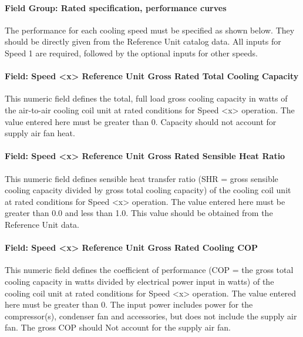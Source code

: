 \paragraph{Field Group: Rated specification, performance curves}\label{field-group-rated-specification-performance-curves}

The performance for each cooling speed must be specified as shown below. They should be directly given from the Reference Unit catalog data. All inputs for Speed 1 are required, followed by the optional inputs for other speeds.

\paragraph{Field: Speed \textless{}x\textgreater{} Reference Unit Gross Rated Total Cooling Capacity}\label{field-speed-x-reference-unit-gross-rated-total-cooling-capacity}

This numeric field defines the total, full load gross cooling capacity in watts of the air-to-air cooling coil unit at rated conditions for Speed \textless{}x\textgreater{} operation. The value entered here must be greater than 0. Capacity should not account for supply air fan heat.

\paragraph{Field: Speed \textless{}x\textgreater{} Reference Unit Gross Rated Sensible Heat Ratio}\label{field-speed-x-reference-unit-gross-rated-sensible-heat-ratio}

This numeric field defines sensible heat transfer ratio (SHR = gross sensible cooling capacity divided by gross total cooling capacity) of the cooling coil unit at rated conditions for Speed \textless{}x\textgreater{} operation. The value entered here must be greater than 0.0 and less than 1.0. This value should be obtained from the Reference Unit data.

\paragraph{Field: Speed \textless{}x\textgreater{} Reference Unit Gross Rated Cooling COP}\label{field-speed-x-reference-unit-gross-rated-cooling-cop}

This numeric field defines the coefficient of performance (COP = the gross total cooling capacity in watts divided by electrical power input in watts) of the cooling coil unit at rated conditions for Speed \textless{}x\textgreater{} operation. The value entered here must be greater than 0. The input power includes power for the compressor(s), condenser fan and accessories, but does not include the supply air fan. The gross COP should Not account for the supply air fan.

